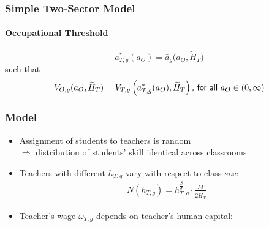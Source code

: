 \documentclass[11pt]{beamer}
\begin{document}
	\begin{frame}
		\frametitle{Simple Two-Sector Model}
		\framesubtitle{Occupational Threshold}
		\begin{equation*}
			a^*_{T,g}(a_O) = \bar{a}_g\big(a_{O},\widetilde{H}_T\big) %
		\end{equation*}
		such that
		\begin{equation}
			\label{eq:indiff}
			V_{O,g}(a_{O},\widetilde{H}_T) = V_{T,g}\left(a^*_{T,g}(a_O),\widetilde{H}_T\right) \textrm{{\sf , for all} } a_O \in (0,\infty) \nonumber
		\end{equation}
	\end{frame}
	
	\begin{frame}
		\frametitle{Model}
			\begin{itemize}
				\item Assignment of students to teachers is random \\ $\Rightarrow$ distribution of students' skill identical across classrooms
				\item Teachers with different $h_{T,g}$ vary with respect to class {\it size}
				\begin{align*}
					N(h_{T,g})=h_{T,g}^\frac{\beta}{\sigma} \cdot \frac{M}{2\widetilde{H}_T}
				\end{align*}
				\item Teacher's wage $\omega_{T,g}$ depends on teacher's human capital:
				\begin{align*}

\end{align*}
\end{itemize}
\end{frame}
\end{document}
